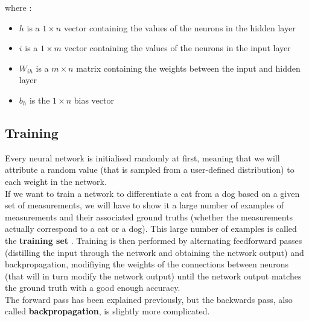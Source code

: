 \noindent where : 
\begin{itemize}
	\item $h$ is a $1\times n$ vector containing the values of the neurons 
		in the hidden layer
	\item $i$ is a $1\times m$ vector containing the values of the neurons
		in the input layer
	\item $W_{ih}$ is a $m\times n$ matrix containing the weights between
		the input and hidden layer
	\item $b_h$ is the $1\times n$ bias vector 
\end{itemize}

\subsection{Training}
\label{nn:training}
Every neural network is initialised randomly at first, meaning that we will
attribute a random value (that is sampled from a user-defined distribution)
to each weight in the network.\\

If we want to train a network to differentiate a cat from a dog based on a
given set of measurements, we will have to show it a large number of examples
of measurements and their associated ground truths 
(whether the measurements actually correspond to a cat or a dog). This large
number of examples is called the \textbf{training set} .
Training is
then performed by alternating feedforward passes (distilling the input through
the network and obtaining the network output) and backpropagation, modifiying 
the weights of the connections between neurons (that will in turn modify 
the network output) until the network output matches the ground truth with 
a good enough accuracy.\\

The forward pass has been explained previously, but the backwards pass, also
called \textbf{backpropagation}, is slightly more complicated.\\

